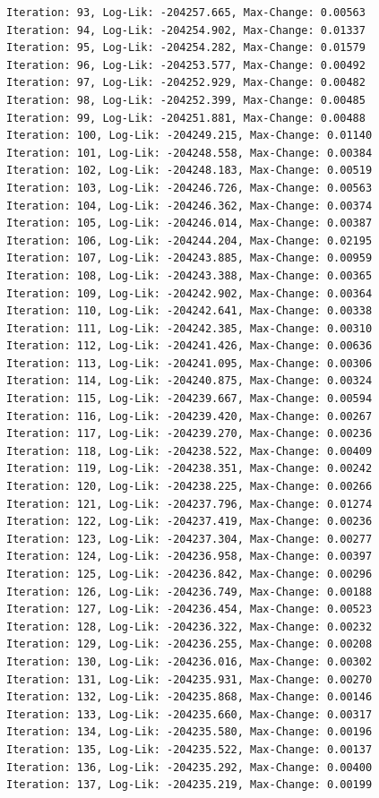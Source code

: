 \documentclass[
  letterpaper,
  DIV=11,
  numbers=noendperiod]{scrreport}
\begin{document}
\begin{verbatim}
Iteration: 93, Log-Lik: -204257.665, Max-Change: 0.00563
Iteration: 94, Log-Lik: -204254.902, Max-Change: 0.01337
Iteration: 95, Log-Lik: -204254.282, Max-Change: 0.01579
Iteration: 96, Log-Lik: -204253.577, Max-Change: 0.00492
Iteration: 97, Log-Lik: -204252.929, Max-Change: 0.00482
Iteration: 98, Log-Lik: -204252.399, Max-Change: 0.00485
Iteration: 99, Log-Lik: -204251.881, Max-Change: 0.00488
Iteration: 100, Log-Lik: -204249.215, Max-Change: 0.01140
Iteration: 101, Log-Lik: -204248.558, Max-Change: 0.00384
Iteration: 102, Log-Lik: -204248.183, Max-Change: 0.00519
Iteration: 103, Log-Lik: -204246.726, Max-Change: 0.00563
Iteration: 104, Log-Lik: -204246.362, Max-Change: 0.00374
Iteration: 105, Log-Lik: -204246.014, Max-Change: 0.00387
Iteration: 106, Log-Lik: -204244.204, Max-Change: 0.02195
Iteration: 107, Log-Lik: -204243.885, Max-Change: 0.00959
Iteration: 108, Log-Lik: -204243.388, Max-Change: 0.00365
Iteration: 109, Log-Lik: -204242.902, Max-Change: 0.00364
Iteration: 110, Log-Lik: -204242.641, Max-Change: 0.00338
Iteration: 111, Log-Lik: -204242.385, Max-Change: 0.00310
Iteration: 112, Log-Lik: -204241.426, Max-Change: 0.00636
Iteration: 113, Log-Lik: -204241.095, Max-Change: 0.00306
Iteration: 114, Log-Lik: -204240.875, Max-Change: 0.00324
Iteration: 115, Log-Lik: -204239.667, Max-Change: 0.00594
Iteration: 116, Log-Lik: -204239.420, Max-Change: 0.00267
Iteration: 117, Log-Lik: -204239.270, Max-Change: 0.00236
Iteration: 118, Log-Lik: -204238.522, Max-Change: 0.00409
Iteration: 119, Log-Lik: -204238.351, Max-Change: 0.00242
Iteration: 120, Log-Lik: -204238.225, Max-Change: 0.00266
Iteration: 121, Log-Lik: -204237.796, Max-Change: 0.01274
Iteration: 122, Log-Lik: -204237.419, Max-Change: 0.00236
Iteration: 123, Log-Lik: -204237.304, Max-Change: 0.00277
Iteration: 124, Log-Lik: -204236.958, Max-Change: 0.00397
Iteration: 125, Log-Lik: -204236.842, Max-Change: 0.00296
Iteration: 126, Log-Lik: -204236.749, Max-Change: 0.00188
Iteration: 127, Log-Lik: -204236.454, Max-Change: 0.00523
Iteration: 128, Log-Lik: -204236.322, Max-Change: 0.00232
Iteration: 129, Log-Lik: -204236.255, Max-Change: 0.00208
Iteration: 130, Log-Lik: -204236.016, Max-Change: 0.00302
Iteration: 131, Log-Lik: -204235.931, Max-Change: 0.00270
Iteration: 132, Log-Lik: -204235.868, Max-Change: 0.00146
Iteration: 133, Log-Lik: -204235.660, Max-Change: 0.00317
Iteration: 134, Log-Lik: -204235.580, Max-Change: 0.00196
Iteration: 135, Log-Lik: -204235.522, Max-Change: 0.00137
Iteration: 136, Log-Lik: -204235.292, Max-Change: 0.00400
Iteration: 137, Log-Lik: -204235.219, Max-Change: 0.00199

\end{verbatim}
\end{document}
